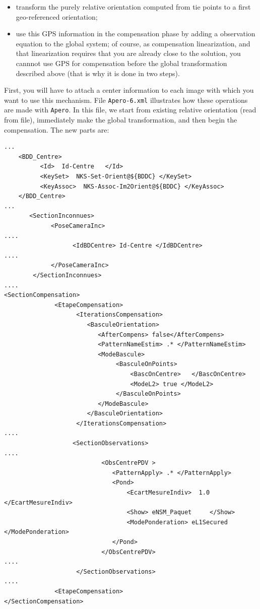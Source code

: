 \begin{itemize}
   \item transform the purely relative orientation computed from tie points 
         to a first geo-referenced orientation;

   \item use this GPS information in the compensation phase by adding a observation
         equation to the global system; of course, as compensation  linearization,
         and that linearization requires that you are already close to the solution,
         you cannnot use GPS for compensation before  the global transformation
         described above (that is why it is done in two steps).

\end{itemize}

First, you will  have to attach a center information to each image with which you want
to use this mechanism.
File {\tt Apero-6.xml} illustrates how these operations are made with {\tt Apero}.
In this file, we start from existing relative orientation (read from file),
immediately make the global transformation, and then begin the compensation.
The new parts are:

{\scriptsize
\begin{verbatim}
...
    <BDD_Centre>
          <Id>  Id-Centre   </Id>
          <KeySet>  NKS-Set-Orient@${BDDC} </KeySet>
          <KeyAssoc>  NKS-Assoc-Im2Orient@${BDDC} </KeyAssoc>
    </BDD_Centre>
...
       <SectionInconnues>
             <PoseCameraInc>
....
                   <IdBDCentre> Id-Centre </IdBDCentre>
....
             </PoseCameraInc>
        </SectionInconnues>
....
<SectionCompensation>
              <EtapeCompensation>
                    <IterationsCompensation>
                       <BasculeOrientation>
                          <AfterCompens> false</AfterCompens>
                          <PatternNameEstim> .* </PatternNameEstim>
                          <ModeBascule>
                               <BasculeOnPoints>
                                   <BascOnCentre>   </BascOnCentre>
                                   <ModeL2> true </ModeL2>
                               </BasculeOnPoints>
                          </ModeBascule>
                       </BasculeOrientation>
                    </IterationsCompensation>
....
                   <SectionObservations>
....
                           <ObsCentrePDV >
                              <PatternApply> .* </PatternApply>
                              <Pond>
                                  <EcartMesureIndiv>  1.0 </EcartMesureIndiv>
                                  <Show> eNSM_Paquet     </Show>
                                  <ModePonderation> eL1Secured </ModePonderation>
                              </Pond>
                           </ObsCentrePDV>
....
                    </SectionObservations>
....
              <EtapeCompensation>
</SectionCompensation>
\end{verbatim}
}

